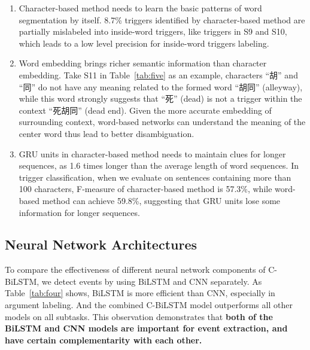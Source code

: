 \begin{enumerate}
	\item Character-based method needs to learn the basic patterns of word segmentation by itself. 8.7\% triggers identified by character-based method are partially mislabeled into inside-word triggers, like triggers in S9 and S10,  which leads to a low level precision for inside-word triggers labeling.
	\item Word embedding brings richer semantic information than character embedding. Take S11 in Table~\ref{tab:five} as an example, characters ``胡'' and ``同'' do not have any meaning related to the formed word ``胡同'' (alleyway), while this word strongly suggests that ``死'' (dead) is not a trigger within the context ``死胡同'' (dead end). Given the more accurate embedding of surrounding context, word-based networks can understand the meaning of the center word thus lead to better disambiguation.
	\item GRU units in character-based method needs to maintain clues for longer sequences, as 1.6 times longer than the average length of word sequences. In trigger classification, when we evaluate on sentences containing more than 100 characters, F-measure of character-based method is 57.3\%, while word-based method can achieve 59.8\%, suggesting that GRU units lose some information for longer sequences.
\end{enumerate}

\subsection{Neural Network Architectures}
To compare the effectiveness of different neural network components of C-BiLSTM, we detect events by using BiLSTM and CNN separately. As Table~\ref{tab:four} shows, BiLSTM is more efficient than CNN, especially in argument labeling. And the combined C-BiLSTM model outperforms all other models on all subtasks. This observation demonstrates that \textbf{both of the BiLSTM and CNN models are important for event extraction, and have certain complementarity with each other.}

